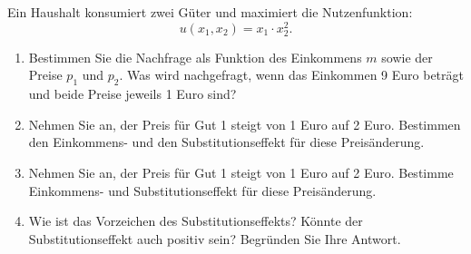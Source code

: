 \begin{question}
	Ein Haushalt konsumiert zwei Güter und maximiert die Nutzenfunktion:
	\[
		u(x_1,x_2) = x_1 \cdot x_2^2
		.\]
	\begin{enumerate}
		\item Bestimmen Sie die Nachfrage als Funktion des Einkommens $m$ sowie der Preise $p_1$ und $p_2$. Was
		      wird nachgefragt, wenn das Einkommen 9 Euro beträgt und beide Preise jeweils 1 Euro sind?
		\item  Nehmen Sie an, der Preis für Gut 1 steigt von 1 Euro auf 2 Euro. Bestimmen den Einkommens-
		      und den Substitutionseffekt für diese Preisänderung.
		\item Nehmen Sie an, der Preis für Gut 1 steigt von 1 Euro auf 2 Euro. Bestimme Einkommens-
		      und  Substitutionseffekt für diese Preisänderung.
		\item Wie ist das Vorzeichen des Substitutionseffekts? Könnte der Substitutionseffekt auch positiv sein?
		      Begründen Sie Ihre Antwort.
	\end{enumerate}
\end{question}
